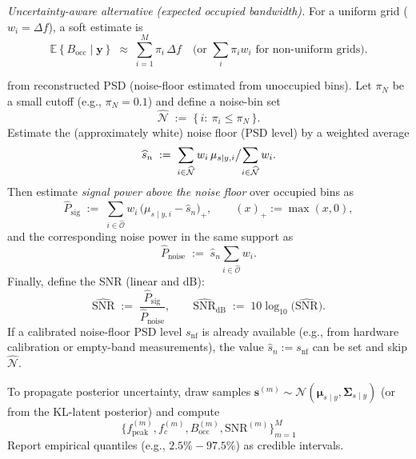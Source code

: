 \documentclass[11pt,a4paper]{report}
\theoremstyle{definition}
\providecommand{\promed}[1]{{\mathbb{E}}\left\lbrace #1\right\rbrace}
\providecommand{\ve}[1]{{\boldsymbol{#1}}}
\providecommand{\mat}[1]{{\pmb{#1}}}
\begin{document}
\begin{description}
\smallskip
\noindent\emph{Uncertainty-aware alternative (expected occupied bandwidth).}
For a uniform grid ($w_i=\Delta f$), a soft estimate is
\[
\promed{B_{\mathrm{occ}}\mid \ve{y}} \;\approx\; \sum_{i=1}^M \pi_i\,\Delta f
\quad
\text{(or }\sum_i \pi_i w_i\text{ for non-uniform grids).}
\]

\item[{SNR}] from reconstructed PSD (noise-floor estimated from unoccupied bins).
Let $\pi_N$ be a small cutoff (e.g., $\pi_N=0.1$) and define a noise-bin set
\[
\widehat{\mathcal{N}} \;:=\; \{\,i:\ \pi_i\le \pi_N\,\}.
\]
Estimate the (approximately white) noise floor (PSD level) by a weighted average
\[
\widehat{s}_{n} \;:=\;
{\sum\limits_{i\in\widehat{\mathcal{N}}} w_i\, \mu_{s\mid y,i}}\big{/}
{\sum\limits_{i\in\widehat{\mathcal{N}}} w_i}.
\]
Then estimate \emph{signal power above the noise floor} over occupied bins as
\[
\widehat{P}_{\mathrm{sig}}
\;:=\;
\sum_{i\in\widehat{\mathcal{O}}} w_i\,\big(\mu_{s\mid y,i}-\widehat{s}_n\big)_+,
\qquad (x)_+:=\max(x,0),
\]
and the corresponding noise power in the same support as
\[
\widehat{P}_{\mathrm{noise}}
\;:=\;
\widehat{s}_{n}\sum_{i\in\widehat{\mathcal{O}}} w_i.
\]
Finally, define the SNR (linear and dB):
\[
\widehat{\mathrm{SNR}}
\;:=\;
\frac{\widehat{P}_{\mathrm{sig}}}{\widehat{P}_{\mathrm{noise}}},
\qquad
\widehat{\mathrm{SNR}}_{\mathrm{dB}}
\;:=\;
10\log_{10}\big(\widehat{\mathrm{SNR}}\big).
\]
If a calibrated noise-floor PSD level $s_{\mathrm{nf}}$ is already available (e.g., from hardware calibration or empty-band measurements), the value $\widehat{s}_n:=s_{\mathrm{nf}}$ can be set and skip $\widehat{\mathcal{N}}$.


\item[{(0)Credible intervals for these features.}]
To propagate posterior uncertainty, draw samples
$\ve{s}^{(m)}{\sim}\mathcal{N}(\boldsymbol{\mu}_{s\mid y},\mat{\Sigma}_{s\mid y})$
(or from the KL-latent posterior) and compute
\[\{f_{\mathrm{peak}}^{(m)}, f_c^{(m)}, B_{\mathrm{occ}}^{(m)}, \mathrm{SNR}^{(m)}\}_{m=1}^M
\]
Report empirical quantiles (e.g., $2.5\%-97.5\%$) as credible intervals.
\end{description}
%
\end{document}
